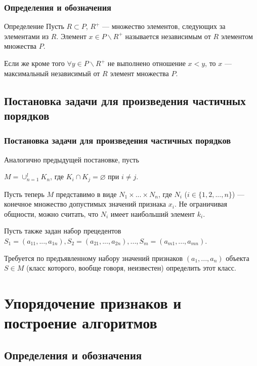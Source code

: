 \documentclass[
	11pt,
]{beamer}
\begin{document}
\begin{frame}
	\frametitle{Определения и обозначения}
	
	\begin{block}{Определение}
		Пусть $R \subset P$, $R^+$ — множество элементов, следующих за элементами из $R$. Элемент $x \in P \backslash R^+$ называется независимым от $R$ элементом множества $P$.

		\bigskip

		Если же кроме того $\forall y \in P \backslash R^+$ не выполнено отношение $x < y$, то $x$ — максимальный независимый от $R$ элемент множества $P$.
	\end{block}

\end{frame}

\subsection{Постановка задачи для произведения частичных порядков}

\begin{frame}
	\frametitle{Постановка задачи для произведения частичных порядков}
	Аналогично предыдущей постановке, пусть
	
	$M = \cup_{n=1}^{l}K_n$, где $K_i \cap K_j = \varnothing$ при $i \neq j$.

	\bigskip

	Пусть теперь $M$ представимо в виде $N_1 \times ... \times N_n$, где $N_i$ ($i \in \{1, 2, ..., n\}$) — конечное множество допустимых значений признака $x_i$. Не ограничивая общности, можно считать, что $N_i$ имеет наибольший элемент $k_i$.

	Пусть также задан набор прецедентов $S_1 = (a_{11}, ..., a_{1n}), S_2 = (a_{21}, ..., a_{2n}), ..., S_m = (a_{m1}, ..., a_{mn})$.

	\bigskip

	Требуется по предъявленному набору значений признаков $(a_1, ..., a_n)$ объекта $S \in M$ (класс которого, вообще говоря, неизвестен) определить этот класс.
	
\end{frame}

\section{Упорядочение признаков и построение алгоритмов}

\subsection{Определения и обозначения}
\end{document}
